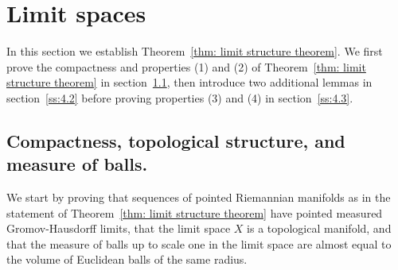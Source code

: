 \documentclass[11pt,reqno]{amsart}
\theoremstyle{remark}
\theoremstyle{definition}
\numberwithin{equation}{section}
\begin{document}
\section{Limit spaces}
In this section we establish Theorem~\ref{thm: limit structure theorem}. We first prove the compactness and properties (1) and (2) of Theorem~\ref{thm: limit structure theorem} in section~\ref{ss:4.1}, then introduce two additional lemmas in section~\ref{ss:4.2} before proving properties (3) and (4) in section~\ref{ss:4.3}.

\subsection{Compactness, topological structure, and measure of balls.}\label{ss:4.1} 
We start by proving that sequences of pointed Riemannian manifolds as in the statement of Theorem~\ref{thm: limit structure theorem} have pointed measured Gromov-Hausdorff limits, that the limit space $X$ is a topological manifold, and that the measure of balls up to scale one in the limit space are almost equal to the volume of Euclidean balls of the same radius.
\end{document}
